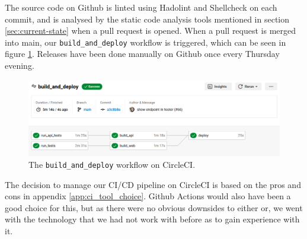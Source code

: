 The source code on Github is linted using Hadolint and Shellcheck on each commit, and is analysed by the static code analysis tools mentioned in section \ref{sec:current-state} when a pull request is opened. 
When a pull request is merged into main, our \texttt{build\_and\_deploy} workflow is triggered, which can be seen in figure \ref{fig:build_and_deploy}. 
Releases have been done manually on Github once every Thursday evening.

\begin{figure}[H]
    \centering
    \includegraphics[width=\textwidth]{images/pipeline.png}
    \caption{The \texttt{build\_and\_deploy} workflow on CircleCI.}
    \label{fig:build_and_deploy}
\end{figure}

The decision to manage our CI/CD pipeline on CircleCI is based on the pros and cons in appendix \ref{app:ci_tool_choice}. 
Github Actions would also have been a good choice for this, but as there were no obvious downsides to either or, we went with the technology that we had not work with before as to gain experience with it.






